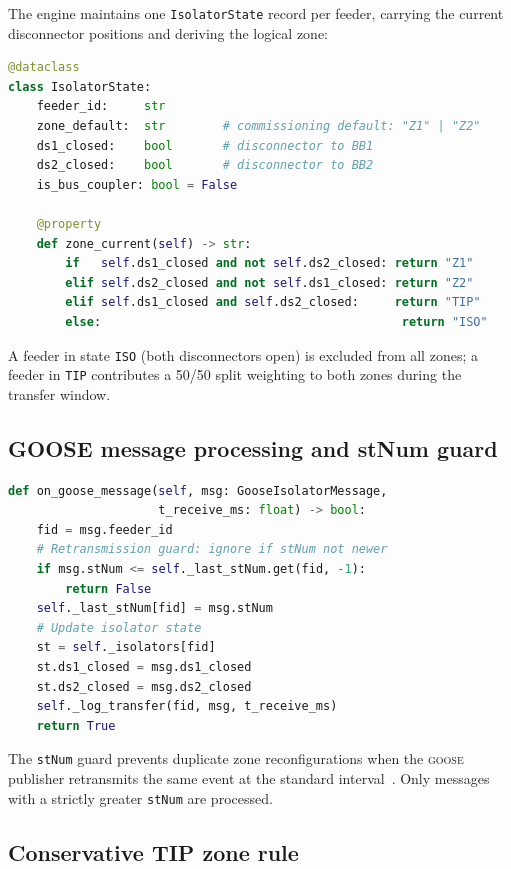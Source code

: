 \documentclass[11pt,a4paper]{article}
\newcommand{\goose}{\textsc{goose}}
\begin{document}
The engine maintains one \texttt{IsolatorState} record per feeder,
carrying the current disconnector positions and deriving the logical zone:

\begin{lstlisting}[language=Python, caption={IsolatorState and zone derivation}]
@dataclass
class IsolatorState:
    feeder_id:     str
    zone_default:  str        # commissioning default: "Z1" | "Z2"
    ds1_closed:    bool       # disconnector to BB1
    ds2_closed:    bool       # disconnector to BB2
    is_bus_coupler: bool = False

    @property
    def zone_current(self) -> str:
        if   self.ds1_closed and not self.ds2_closed: return "Z1"
        elif self.ds2_closed and not self.ds1_closed: return "Z2"
        elif self.ds1_closed and self.ds2_closed:     return "TIP"
        else:                                          return "ISO"
\end{lstlisting}

\noindent A feeder in state \texttt{ISO} (both disconnectors open) is
excluded from all zones; a feeder in \texttt{TIP} contributes a 50/50
split weighting to both zones during the transfer window.

\subsection{GOOSE message processing and stNum guard}

\begin{lstlisting}[language=Python, caption={GOOSE message handler with stNum guard}]
def on_goose_message(self, msg: GooseIsolatorMessage,
                     t_receive_ms: float) -> bool:
    fid = msg.feeder_id
    # Retransmission guard: ignore if stNum not newer
    if msg.stNum <= self._last_stNum.get(fid, -1):
        return False
    self._last_stNum[fid] = msg.stNum
    # Update isolator state
    st = self._isolators[fid]
    st.ds1_closed = msg.ds1_closed
    st.ds2_closed = msg.ds2_closed
    self._log_transfer(fid, msg, t_receive_ms)
    return True
\end{lstlisting}

\noindent The \texttt{stNum} guard prevents duplicate zone reconfigurations
when the \goose{} publisher retransmits the same event at the standard
interval~\cite{IEC61850_8_1}.  Only messages with a strictly greater
\texttt{stNum} are processed.

\subsection{Conservative TIP zone rule}
\end{document}
